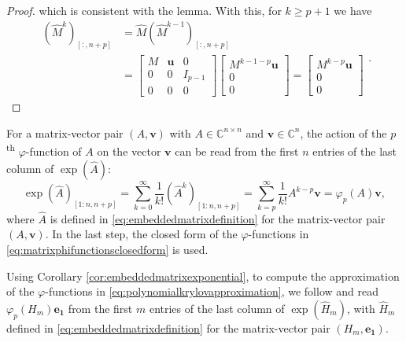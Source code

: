 \begin{proof}
    which is consistent with the lemma.
    With this, for $k \ge p+1$ we have
    \begin{equation*}
        \begin{aligned}
            (\hat{M}^k)_{[:, n+p]} & = \hat{M} (\hat{M}^{k-1})_{[:, n+p]} \\
            & =
            \begin{bmatrix} M & \mathbf{u} & 0\\ 0 & 0 & I_{p-1}\\ 0 & 0 & 0 \end{bmatrix}
            \begin{bmatrix} M^{k-1-p} \mathbf{u} \\ 0 \\ 0 \end{bmatrix}
            =
            \begin{bmatrix} M^{k-p} \mathbf{u} \\ 0 \\ 0 \end{bmatrix}
        \end{aligned}.
    \end{equation*}
\end{proof}

\begin{corollary}
    \label{cor:embeddedmatrixexponential}
    For a matrix-vector pair $(A, \mathbf{v})$ with $A \in \mathbb{C}^{n \times n}$ and
    $\mathbf{v} \in \mathbb{C}^n$, the action of the $p$\textsuperscript{th} $\varphi$-function
    of $A$ on the vector $\mathbf{v}$ can be read from the first $n$ entries of the last
    column of $\exp(\hat{A})$:
    \begin{equation*}
        \exp(\hat{A})_{[1 : n, n+p]}
        = \sum_{k=0}^{\infty}{\frac{1}{k!} (\hat{A}^k)_{[1 : n, n+p]}}
        = \sum_{k=p}^{\infty}{\frac{1}{k!} A^{k-p} \mathbf{v}} = \varphi_p(A) \mathbf{v},
    \end{equation*}
    where $\hat{A}$ is defined in \eqref{eq:embeddedmatrixdefinition} for the matrix-vector
    pair $(A, \mathbf{v})$. In the last step, the closed form of the $\varphi$-functions in
    \eqref{eq:matrixphifunctionsclosedform} is used.
\end{corollary}

Using Corollary \ref{cor:embeddedmatrixexponential}, to compute the approximation
of the $\varphi$-functions in \eqref{eq:polynomialkrylovapproximation},
we follow \cite{niesen2012} and read $\varphi_p(H_m) \mathbf{e_1}$ from the first $m$ entries
of the last column of $\exp(\hat{H}_m)$, with $\hat{H}_m$ defined in
\eqref{eq:embeddedmatrixdefinition} for the matrix-vector pair $(H_m, \mathbf{e_1})$.

